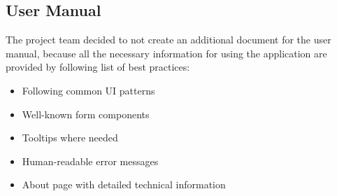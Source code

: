 \subsection{User Manual}\label{subsec:user-manuel}
The project team decided to not create an additional document for the user manual,
because all the necessary information for using the application are provided by following list of best practices:
\begin{itemize}
    \item Following common UI patterns
    \item Well-known form components
    \item Tooltips where needed
    \item Human-readable error messages
    \item About page with detailed technical information
\end{itemize}

